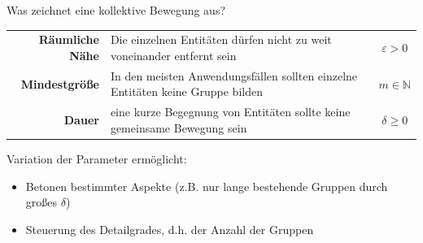\documentclass[
wide,
10pt,
xcolor={x11names,svgnames},
hyperref={pdfauthor={Jannes Bantje},colorlinks,urlcolor=maincolor,hidelinks=false,linkcolor=maincolor},
pantone312, 	%
euler-digits,
]{beamer}
\newcommand{\bet}[1]{\textbf{\color{maincolor}#1}}
\theoremstyle{definition}
\begin{document}
\begin{frame}{Was zeichnet eine kollektive Bewegung aus?}
    \begin{tabular}{rp{8cm}c}
        \bet{Räumliche Nähe} & Die einzelnen Entitäten dürfen nicht zu weit voneinander entfernt sein & $\varepsilon>0$\\
        \bet{Mindestgröße} & In den meisten Anwendungsfällen sollten einzelne Entitäten keine Gruppe bilden & $m \in \mathbb{N}$ \\
        \bet{Dauer} & eine kurze Begegnung von Entitäten sollte keine gemeinsame Bewegung sein & $\delta \ge 0$ \\
    \end{tabular}
    \vspace{1em}
    
    Variation der Parameter ermöglicht:
    \begin{itemize}
        \item Betonen bestimmter Aspekte (z.B. nur lange bestehende Gruppen durch großes $\delta$)
        \item Steuerung des Detailgrades, d.h. der Anzahl der Gruppen
    \end{itemize}
\end{frame}
\end{document}
